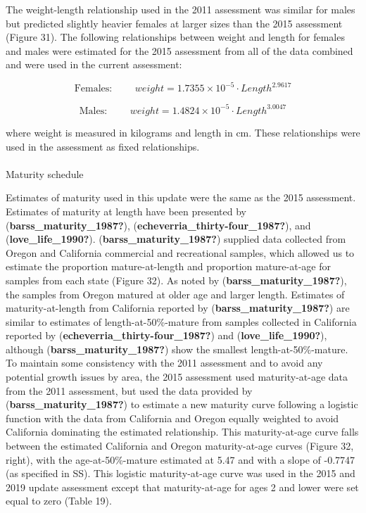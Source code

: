 \documentclass[
]{scrartcl}
\makeatletter
\let\oldparagraph\paragraph
\renewcommand{\paragraph}{
    \@ifstar
      \xxxParagraphStar
      \xxxParagraphNoStar
  }
\newcommand{\xxxParagraphStar}[1]{\oldparagraph*{#1}\mbox{}}
\newcommand{\xxxParagraphNoStar}[1]{\oldparagraph{#1}\mbox{}}
\makeatother
\begin{document}
The weight-length relationship used in the 2011 assessment was similar
for males but predicted slightly heavier females at larger sizes than
the 2015 assessment (Figure 31). The following relationships between
weight and length for females and males were estimated for the 2015
assessment from all of the data combined and were used in the current
assessment:

\[
\text{Females: } \qquad weight = 1.7355 \times 10^{-5} \cdot Length^{2.9617}
\]

\[
\text{Males: } \qquad weight = 1.4824 \times 10^{-5} \cdot Length^{3.0047}
\]

where weight is measured in kilograms and length in cm. These
relationships were used in the assessment as fixed relationships.

\paragraph{Maturity schedule}\label{maturity-schedule}

Estimates of maturity used in this update were the same as the 2015
assessment. Estimates of maturity at length have been presented by
(\textbf{barss\_maturity\_1987?}),
(\textbf{echeverria\_thirty-four\_1987?}), and
(\textbf{love\_life\_1990?}). (\textbf{barss\_maturity\_1987?}) supplied
data collected from Oregon and California commercial and recreational
samples, which allowed us to estimate the proportion mature-at-length
and proportion mature-at-age for samples from each state (Figure 32). As
noted by (\textbf{barss\_maturity\_1987?}), the samples from Oregon
matured at older age and larger length. Estimates of maturity-at-length
from California reported by (\textbf{barss\_maturity\_1987?}) are
similar to estimates of length-at-50\%-mature from samples collected in
California reported by (\textbf{echeverria\_thirty-four\_1987?}) and
(\textbf{love\_life\_1990?}), although (\textbf{barss\_maturity\_1987?})
show the smallest length-at-50\%-mature. To maintain some consistency
with the 2011 assessment and to avoid any potential growth issues by
area, the 2015 assessment used maturity-at-age data from the 2011
assessment, but used the data provided by
(\textbf{barss\_maturity\_1987?}) to estimate a new maturity curve
following a logistic function with the data from California and Oregon
equally weighted to avoid California dominating the estimated
relationship. This maturity-at-age curve falls between the estimated
California and Oregon maturity-at-age curves (Figure 32, right), with
the age-at-50\%-mature estimated at 5.47 and with a slope of -0.7747 (as
specified in SS). This logistic maturity-at-age curve was used in the
2015 and 2019 update assessment except that maturity-at-age for ages 2
and lower were set equal to zero (Table 19).
\end{document}
